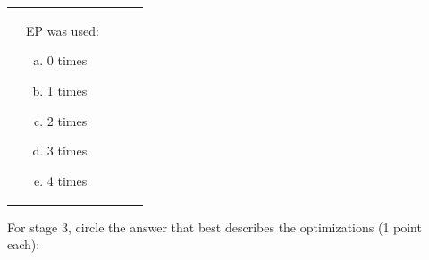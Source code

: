 \documentclass[11pt]{article} %
\begin{document}
\begin{enumerate}
\begin{tabular}{lllll}
&
\begin{minipage}{1in}
EP was used:\vspace{-3.5ex}
\newline
\begin{enumerate}[(a)]
\item 0 times
\item 1 times
\item 2 times
\item 3 times
\item 4 times
\end{enumerate}
\end{minipage}
\end{tabular}
\vspace{5ex}

For stage 3, circle the answer that best describes the optimizations (1 point each):\newline


\end{enumerate}
\end{document}
